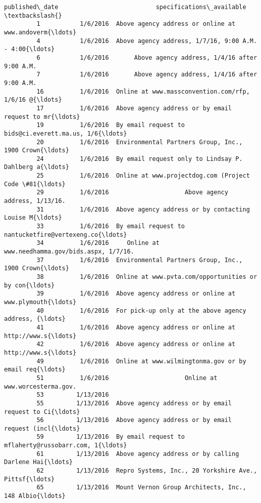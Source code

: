 \documentclass[11pt]{article}
\begin{document}
\begin{Verbatim}[commandchars=\\\{\}]
               published\_date                           specifications\_available  \textbackslash{}
         1           1/6/2016  Above agency address or online at www.andoverm{\ldots}   
         4           1/6/2016  Above agency address, 1/7/16, 9:00 A.M. - 4:00{\ldots}   
         6           1/6/2016       Above agency address, 1/4/16 after 9:00 A.M.   
         7           1/6/2016       Above agency address, 1/4/16 after 9:00 A.M.   
         16          1/6/2016  Online at www.massconvention.com/rfp, 1/6/16 @{\ldots}   
         17          1/6/2016  Above agency address or by email request to mr{\ldots}   
         19          1/6/2016  By email request to bids@ci.everett.ma.us, 1/6{\ldots}   
         20          1/6/2016  Environmental Partners Group, Inc., 1900 Crown{\ldots}   
         24          1/6/2016  By email request only to Lindsay P. Dahlberg a{\ldots}   
         25          1/6/2016  Online at www.projectdog.com (Project Code \#81{\ldots}   
         29          1/6/2016                     Above agency address, 1/13/16.   
         31          1/6/2016  Above agency address or by contacting Louise M{\ldots}   
         33          1/6/2016  By email request to nantucketfire@vertexeng.co{\ldots}   
         34          1/6/2016     Online at www.needhamma.gov/bids.aspx, 1/7/16.   
         37          1/6/2016  Environmental Partners Group, Inc., 1900 Crown{\ldots}   
         38          1/6/2016  Online at www.pvta.com/opportunities or by con{\ldots}   
         39          1/6/2016  Above agency address or online at www.plymouth{\ldots}   
         40          1/6/2016  For pick-up only at the above agency address, {\ldots}   
         41          1/6/2016  Above agency address or online at http://www.s{\ldots}   
         42          1/6/2016  Above agency address or online at http://www.s{\ldots}   
         49          1/6/2016  Online at www.wilmingtonma.gov or by email req{\ldots}   
         51          1/6/2016                     Online at www.worcesterma.gov.   
         53         1/13/2016                                                      
         55         1/13/2016  Above agency address or by email request to Ci{\ldots}   
         56         1/13/2016  Above agency address or by email request (incl{\ldots}   
         59         1/13/2016  By email request to mflaherty@russobarr.com, 1{\ldots}   
         61         1/13/2016  Above agency address or by calling Darlene Hai{\ldots}   
         62         1/13/2016  Repro Systems, Inc., 20 Yorkshire Ave., Pittsf{\ldots}   
         65         1/13/2016  Mount Vernon Group Architects, Inc., 148 Albio{\ldots}   

\end{Verbatim}
\end{document}
